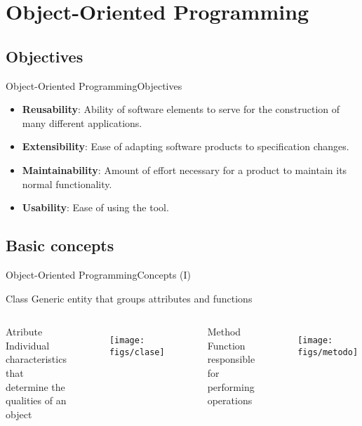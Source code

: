 \documentclass[10pt,compress]{beamer} %
\begin{document}
\section[Object-Oriented Programming]{Object-Oriented Programming}

\subsection{Objectives}

\begin{frame}{Object-Oriented Programming}{Objectives}
\begin{itemize}
  	\item \textbf{Reusability}: Ability of software elements to serve for the construction of many different applications.
  	\item \textbf{Extensibility}: Ease of adapting software products to specification changes.
  	\item \textbf{Maintainability}: Amount of effort necessary for a product to maintain its normal functionality.   
  	\item \textbf{Usability}: Ease of using the tool.
  	\end{itemize} 	
\end{frame}

\subsection{Basic concepts}

\begin{frame}{Object-Oriented Programming}{Concepts (I)}
	\begin{block}{Class}
		 Generic entity that groups attributes and functions
  	\end{block}	


    \begin{columns}[t]

	    \begin{block}{Atribute}
		Individual characteristics that determine the qualities of an object
  	    \end{block}	

		\begin{figure}
			\texttt{[image: figs/clase]}	
		\end{figure}				


	    \begin{block}{Method}
		 Function responsible for performing operations
  	    \end{block}	
		\begin{figure}
			\texttt{[image: figs/metodo]}
		\end{figure}				
   \end{columns}
\end{frame}
\end{document}
